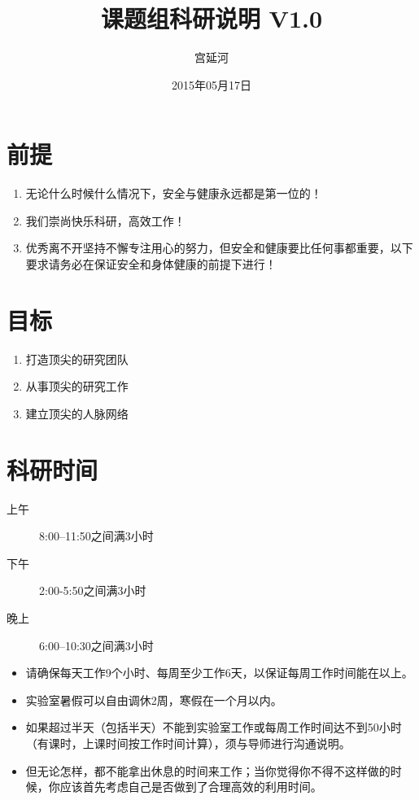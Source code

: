 \documentclass[a4paper，12pt]{article}
\title{课题组科研说明 V1.0} %
\author{宫延河}
\date{2015年05月17日} %
\begin{document}
\maketitle

\section{前提}

\begin{enumerate}
\item 无论什么时候什么情况下，安全与健康永远都是第一位的！
\item 我们崇尚快乐科研，高效工作！
\item 优秀离不开坚持不懈专注用心的努力，但安全和健康要比任何事都重要，以下要求请务必在保证安全和身体健康的前提下进行！
\end{enumerate}

\section{目标}

\begin{enumerate}

\item 打造顶尖的研究团队

\item 从事顶尖的研究工作

\item 建立顶尖的人脉网络

\end{enumerate}

\section{科研时间}

\begin{description}

\item[上午] 8:00--11:50之间满3小时

\item[下午] 2:00-5:50之间满3小时

\item[晚上] 6:00--10:30之间满3小时

\end{description}

\begin{itemize}

\item 请确保每天工作9个小时、每周至少工作6天，以保证每周工作时间能在{\color{red}{50小时}}以上。

\item 实验室暑假可以自由调休2周，寒假在一个月以内。

\item 如果超过半天（包括半天）不能到实验室工作或每周工作时间达不到50小时（有课时，上课时间按工作时间计算），须与导师进行沟通说明。

\item 但无论怎样，都不能拿出休息的时间来工作；当你觉得你不得不这样做的时候，你应该首先考虑自己是否做到了合理高效的利用时间。

\end{itemize}
\end{document}
